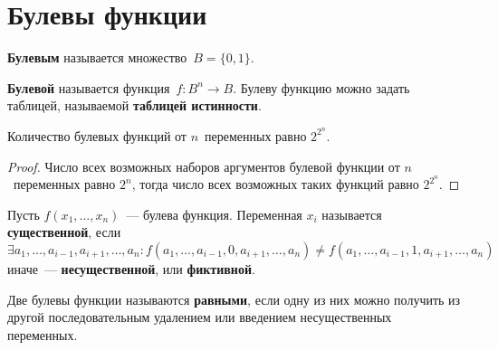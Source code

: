 \section{Булевы функции}
 \textbf{Булевым} называется множество~$B = \{ 0, 1 \}$.

 \textbf{Булевой} называется функция~$f \colon B^n \to B$.
Булеву функцию можно задать таблицей, называемой \textbf{таблицей истинности}.

\begin{statement}
Количество булевых функций от $n$~переменных равно $2^{2^n}$.
\end{statement}
\begin{proof}
Число всех возможных наборов аргументов булевой функции от $n$~переменных равно $2^n$, тогда число всех возможных таких функций равно $2^{2^n}$.
\end{proof}

Пусть $f(x_1, \ldots, x_n)$~--- булева функция.
  Переменная $x_i$ называется \textbf{существенной}, если
\begin{equation*}
\exists a_1, \ldots, a_{i-1}, a_{i+1}, \ldots, a_n \colon
f(a_1, \ldots, a_{i-1}, 0, a_{i+1}, \ldots, a_n) \neq f(a_1, \ldots, a_{i-1}, 1, a_{i+1}, \ldots, a_n)
\end{equation*}
иначе~--- \textbf{несущественной}, или \textbf{фиктивной}.

Две булевы функции называются \textbf{равными}, если одну из них можно получить из другой последовательным удалением или введением несущественных переменных.